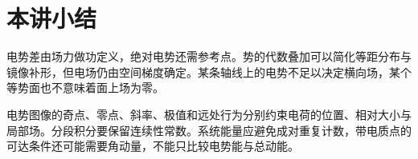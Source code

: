 \section{本讲小结}

电势差由场力做功定义，绝对电势还需参考点。势的代数叠加可以简化等距分布与镜像补形，但电场仍由空间梯度确定。某条轴线上的电势不足以决定横向场，某个等势面也不意味着面上场为零。

电势图像的奇点、零点、斜率、极值和远处行为分别约束电荷的位置、相对大小与局部场。分段积分要保留连续性常数。系统能量应避免成对重复计数，带电质点的可达条件还可能需要角动量，不能只比较电势能与总动能。

